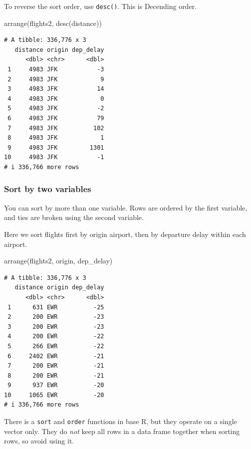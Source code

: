 \documentclass[
  letterpaper,
  DIV=11,
  numbers=noendperiod,
  oneside]{scrreprt}
\newenvironment{Shaded}{\begin{snugshade}}{\end{snugshade}}
\newcommand{\FunctionTok}[1]{\textcolor[rgb]{0.28,0.35,0.67}{#1}}
\newcommand{\NormalTok}[1]{\textcolor[rgb]{0.00,0.23,0.31}{#1}}
\begin{document}
To reverse the sort order, use \texttt{desc()}. This is Decending order.

\begin{Shaded}
\begin{Highlighting}[]
\FunctionTok{arrange}\NormalTok{(flights2, }\FunctionTok{desc}\NormalTok{(distance))}
\end{Highlighting}
\end{Shaded}

\begin{verbatim}
# A tibble: 336,776 x 3
   distance origin dep_delay
      <dbl> <chr>      <dbl>
 1     4983 JFK           -3
 2     4983 JFK            9
 3     4983 JFK           14
 4     4983 JFK            0
 5     4983 JFK           -2
 6     4983 JFK           79
 7     4983 JFK          102
 8     4983 JFK            1
 9     4983 JFK         1301
10     4983 JFK           -1
# i 336,766 more rows
\end{verbatim}

\subsubsection{Sort by two variables}\label{sort-by-two-variables}

You can sort by more than one variable. Rows are ordered by the first
variable, and ties are broken using the second variable.

Here we sort flights first by origin airport, then by departure delay
within each airport.

\begin{Shaded}
\begin{Highlighting}[]
\FunctionTok{arrange}\NormalTok{(flights2, origin, dep\_delay)}
\end{Highlighting}
\end{Shaded}

\begin{verbatim}
# A tibble: 336,776 x 3
   distance origin dep_delay
      <dbl> <chr>      <dbl>
 1      631 EWR          -25
 2      200 EWR          -23
 3      200 EWR          -23
 4      200 EWR          -22
 5      266 EWR          -22
 6     2402 EWR          -21
 7      200 EWR          -21
 8      200 EWR          -21
 9      937 EWR          -20
10     1065 EWR          -20
# i 336,766 more rows
\end{verbatim}

\begin{tcolorbox}[enhanced jigsaw, bottomrule=.15mm, colback=white, colframe=quarto-callout-important-color-frame, toprule=.15mm, coltitle=black, rightrule=.15mm, opacitybacktitle=0.6, colbacktitle=quarto-callout-important-color!10!white, toptitle=1mm, leftrule=.75mm, breakable, bottomtitle=1mm, titlerule=0mm, title=\textcolor{quarto-callout-important-color}{\faExclamation}\hspace{0.5em}{Avoid the base \texttt{sort} function}, arc=.35mm, left=2mm, opacityback=0]

There is a \texttt{sort} and \texttt{order} functions in base R, but
they operate on a single vector only. They do \emph{not} keep all rows
in a data frame together when sorting rows, so avoid using it.

\end{tcolorbox}
\end{document}
